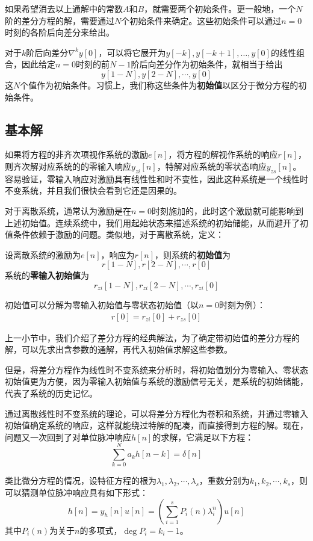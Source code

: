 如果希望消去以上通解中的常数$A$和$B$，就需要两个初始条件。更一般地，一个$N$阶的差分方程的解，需要通过$N$个初始条件来确定。这些初始条件可以通过$n=0$时刻的各阶后向差分来给出。

对于$k$阶后向差分$\nabla^k y[0]$，可以将它展开为$y[-k],y[-k+1],\dots,y[0]$的线性组合，因此给定$n=0$时刻的前$N-1$阶后向差分作为初始条件，就相当于给出
$$y[1-N],y[2-N],\cdots,y[0]$$
这$N$个值作为初始条件。习惯上，我们称这些条件为\textbf{初始值}以区分于微分方程的初始条件。

\subsection{基本解}\label{sub:h_solution}

如果将方程的非齐次项视作系统的激励$e[n]$，将方程的解视作系统的响应$r[n]$，则齐次解对应系统的的零输入响应$y_{zi}[n]$，特解对应系统的零状态响应$y_{zs}[n]$。容易验证，零输入响应对激励具有线性性和时不变性，因此这种系统是一个线性时不变系统，并且我们很快会看到它还是因果的。

对于离散系统，通常认为激励是在$n=0$时刻施加的，此时这个激励就可能影响到上述初始值。连续系统中，我们用起始状态来描述系统的初始储能，从而避开了初值条件依赖于激励的问题。类似地，对于离散系统，定义：
\begin{definition}[离散系统的初始值与零输入初始值]
    设离散系统的激励为$e[n]$，响应为$r[n]$，则系统的\textbf{初始值}为
    $$r[1-N],r[2-N],\cdots,r[0]$$
    系统的\textbf{零输入初始值}为
    $$r_{zi}[1-N],r_{zi}[2-N],\cdots,r_{zi}[0]$$
\end{definition}

初始值可以分解为零输入初始值与零状态初始值（以$n=0$时刻为例）：
\begin{align*}
    r[0]=r_{zi}[0]+r_{zs}[0]
\end{align*}

上一小节中，我们介绍了差分方程的经典解法，为了确定带初始值的差分方程的解，可以先求出含参数的通解，再代入初始值求解这些参数。

但是，将差分方程作为线性时不变系统来分析时，将初始值划分为零输入、零状态初始值更为方便，因为零输入初始值与系统的激励信号无关，是系统的初始储能，代表了系统的历史记忆。

通过离散线性时不变系统的理论，可以将差分方程化为卷积和系统，并通过零输入初始值确定系统的响应，这样就能绕过特解的配凑，而直接得到方程的解。现在，问题又一次回到了对单位脉冲响应$h[n]$的求解，它满足以下方程：
$$\sum_{k=0}^{N}a_k h[n-k] = \delta[n]$$

类比微分方程的情况，设特征方程的根为$\lambda_1,\lambda_2,\cdots,\lambda_s$，重数分别为$k_1,k_2,\cdots,k_s$，则可以猜测单位脉冲响应具有如下形式：
$$h[n]=y_h[n]u[n]=\left(\sum_{i=1}^s P_i(n) \lambda_i^n \right)u[n]$$
其中$P_i(n)$为关于$n$的多项式，$\deg P_i=k_i-1$。

